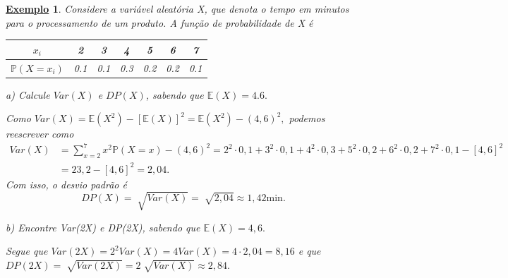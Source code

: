 \documentclass{article}
\newtheorem{example}{\underline{Exemplo}}
\begin{document}
\newpage
\begin{example}
  Considere a variável aleatória X, que denota o tempo em minutos para o processamento de um produto. A função de probabilidade de X é 

  \begin{center}
    \begin{table}[h!]
      \centering
      \begin{tabular}{| c | c c c c c c |}
        \hline 
        \(x_{i}\) & 2 & 3 & 4 & 5 & 6 & 7\\
        \hline
        \(\mathbb{P}(X = x_{i})\) & 0.1 & 0.1 & 0.3 & 0.2 & 0.2 & 0.1\\
        \hline
      \end{tabular}
    \end{table}
  \end{center}

  a) Calcule \(Var(X)\) e \(DP(X)\), sabendo que \(\mathbb{E}(X) = 4.6.\)

  Como \(Var(X) = \mathbb{E}(X^{2}) - [\mathbb{E}(X)]^{2} = \mathbb{E}(X^{2}) - (4,6)^{2},\) podemos reescrever como 
  \begin{align*}
    Var(X) &= \sum\limits_{x=2}^{7}x^{2}\mathbb{P}(X=x) - (4,6)^{2} = 2^{2}\cdot 0,1 + 3^{2}\cdot 0,1 + 4^{2}\cdot 0,3 + 5^{2}\cdot 0,2 + 6^{2}\cdot 0,2 + 7^{2}\cdot 0,1 - [4,6]^{2}\\
           &= 23,2 - [4,6]^{2} = 2,04.
  \end{align*}
  Com isso, o desvio padrão é 
  \[
    DP(X) = \sqrt[]{Var(X)} = \sqrt[]{2,04}\approx 1,42\text{min.}
  \]

  b) Encontre Var(2X) e DP(2X), sabendo que \(\mathbb{E}(X) = 4,6.\)

  Segue que \(Var(2X) = 2^{2}Var(X) = 4Var(X) = 4 \cdot 2,04 = 8,16\) e que \(DP(2X) = \sqrt[]{Var(2X)} = 2\sqrt[]{Var(X)}\approx 2,84.\)
\end{example}
\end{document}
